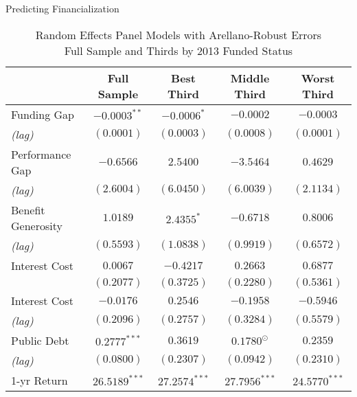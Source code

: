\documentclass{beamer}
\begin{document}
\begin{frame}{\textmd{Predicting Financialization}}
\begin{table}
\begin{tiny}
\begin{center}
\caption{Random Effects Panel Models with Arellano-Robust Errors \\ Full Sample and Thirds by 2013 Funded Status} 
\begin{tabular}{l c c c c }
\hline
 & Full Sample & Best Third & Middle Third & Worst Third \\
\hline
Funding Gap & $-0.0003^{**}$   & $-0.0006^{*}$   & $-0.0002$        & $-0.0003$ \\ 
\hspace*{0.25cm} \emph{(lag)} & $(0.0001)$       & $(0.0003)$      & $(0.0008)$       & $(0.0001)$        \\ [0.4ex]
Performance Gap    & $-0.6566$        & $2.5400$        & $-3.5464$        & $0.4629$          \\
\hspace*{0.25cm} \emph{(lag)}& $(2.6004)$       & $(6.0450)$      & $(6.0039)$       & $(2.1134)$        \\[0.4ex]
Benefit Generosity    & $1.0189$ 		& $2.4355^{*}$    & $-0.6718$        & $0.8006$          \\
\hspace*{0.25cm} \emph{(lag)}& $(0.5593)$       & $(1.0838)$      & $(0.9919)$       & $(0.6572)$        \\[0.4ex]
Interest Cost            & $0.0067$         & $-0.4217$       & $0.2663$         & $0.6877$          \\
                    & $(0.2077)$       & $(0.3725)$      & $(0.2280)$       & $(0.5361)$        \\[0.4ex]
Interest Cost  & $-0.0176$        & $0.2546$        & $-0.1958$        & $-0.5946$         \\
\hspace*{0.25cm} \emph{(lag)} & $(0.2096)$       & $(0.2757)$      & $(0.3284)$       & $(0.5579)$        \\[0.4ex]
Public Debt     & $0.2777^{***}$   & $0.3619$        & $0.1780^{\odot}$ & $0.2359$          \\
\hspace*{0.25cm} \emph{(lag)} & $(0.0800)$       & $(0.2307)$      & $(0.0942)$       & $(0.2310)$        \\[0.4ex]
1-yr Return                & $26.5189^{***}$  & $27.2574^{***}$ & $27.7956^{***}$  & $24.5770^{***}$   \\

\end{tabular}
\end{center}
\end{tiny}
\end{table}
\end{frame}
\end{document}
